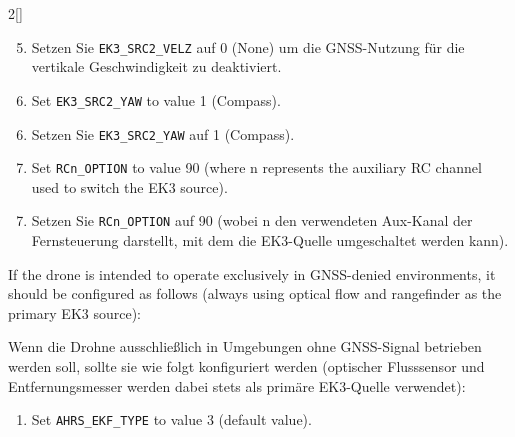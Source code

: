 \begin{paracol}{2}[]
\colger

\begin{enumerate}
\setcounter{enumi}{4}
\item Setzen Sie \texttt{EK3\_SRC2\_VELZ} auf 0 (None) um die GNSS-Nutzung für die vertikale Geschwindigkeit zu deaktiviert.
\end{enumerate}

\coleng

\begin{enumerate} 
\setcounter{enumi}{5}
\item Set \texttt{EK3\_SRC2\_YAW} to value 1 (Compass).
\end{enumerate} 

\colger

\begin{enumerate}
\setcounter{enumi}{5}
\item Setzen Sie \texttt{EK3\_SRC2\_YAW} auf 1 (Compass).
\end{enumerate}

\coleng

\begin{enumerate} 
\setcounter{enumi}{6}
\item Set \texttt{RCn\_OPTION} to value 90 (where n represents the auxiliary RC channel used to switch the EK3 source).
\end{enumerate} 

\colger

\begin{enumerate}
\setcounter{enumi}{6}
\item Setzen Sie \texttt{RCn\_OPTION} auf 90 (wobei n den verwendeten Aux-Kanal der Fernsteuerung darstellt, mit dem die EK3-Quelle umgeschaltet werden kann).
\end{enumerate}

\coleng

If the drone is intended to operate exclusively in GNSS-denied environments, it should be configured as follows (always using optical flow and rangefinder as the primary EK3 source):

\colger

Wenn die Drohne ausschließlich in Umgebungen ohne GNSS-Signal betrieben werden soll, sollte sie wie folgt konfiguriert werden (optischer Flusssensor und Entfernungsmesser werden dabei stets als primäre EK3-Quelle verwendet):

\coleng

\begin{enumerate} 
\item Set \texttt{AHRS\_EKF\_TYPE} to value 3 (default value).
\end{enumerate}


\end{paracol}
